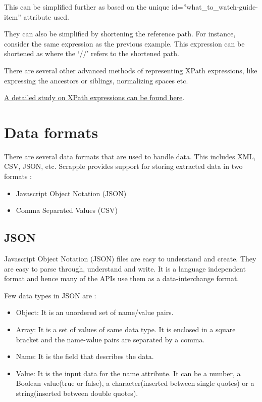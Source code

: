 \documentclass[letterpaper,12pt,english]{sphinxmanual}
\begin{document}

This can be simplified further as  based on the unique id=”what\_to\_watch-guide-item” attribute used.

They can also be simplified by shortening the reference path. For instance, consider the same expression as the previous example. This expression can be shortened as  where the `//' refers to the shortened path.

There are several other advanced methods of representing XPath expressions, like expressing the ancestors or siblings, normalizing spaces etc.

\href{http://www.w3.org/TR/xpath/}{A detailed study on XPath expressions can be found here}.


\section{Data formats}
\label{concepts/formats:concepts-formats}\label{concepts/formats::doc}\label{concepts/formats:data-formats}
There are several data formats that are used to handle data. This includes XML, CSV, JSON, etc. Scrapple provides support for storing extracted data in two formats :
\begin{itemize}
\item {} 
Javascript Object Notation (JSON)

\item {} 
Comma Separated Values (CSV)

\end{itemize}


\subsection{JSON}
\label{concepts/formats:json}
Javascript Object Notation (JSON) files are easy to understand and create. They are easy to parse through, understand and write. It is a language independent format and hence many of the APIs use them as a data-interchange format.

Few data types in JSON are :
\begin{itemize}
\item {} 
Object: It is an unordered set of name/value pairs.

\item {} 
Array: It is a set of values of same data type. It is enclosed in a square bracket and the name-value pairs are separated by a comma.

\item {} 
Name: It is the field that describes the data.

\item {} 
Value: It is the input data for the name attribute. It can be a number, a Boolean value(true or false), a character(inserted between single quotes) or a string(inserted between double quotes).

\end{itemize}
\end{document}
